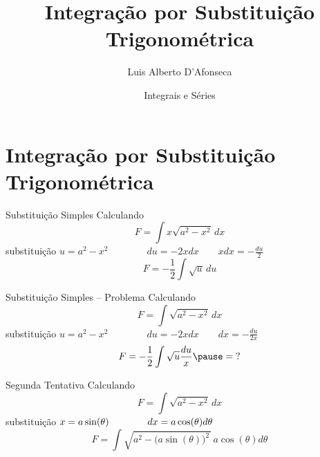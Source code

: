 
\usepackage{apresentacao}
\usepackage{mathconfig}
\usepackage{tabto}
\usepackage{ulem}

\setlength{\parskip}{0.5\baselineskip}

\makeatletter
\graphicspath  {{./figs/}}
\makeatother

\setcounter{exemplo}{0}

\title {Integração por Substituição Trigonométrica}
\author{\large Luis Alberto D'Afonseca}
\date  {Integrais e Séries}



\begin{frame}
    \titlepage
\end{frame}

\section{Integração por Substituição Trigonométrica}

\begin{frame}{Substituição Simples}
  Calculando
  \[
    F = \int x \sqrt{a^2-x^2}\,dx
  \]
  \pause
  substituição
  \(
    u = a^2-x^2
    \qquad\qquad
    du = -2xdx
    \qquad
    xdx = -\frac{du}{2}
  \)
  \pause
  \[
    F = -\frac{1}{2}\int \sqrt{u}\,du
  \]
\end{frame}

\begin{frame}{Substituição Simples -- Problema}
  Calculando
  \[
    F = \int \sqrt{a^2-x^2}\,dx
  \]
  \pause
  substituição
  \(
    u = a^2-x^2
    \qquad\qquad
    du = -2xdx
    \qquad
    dx = -\frac{du}{2x}
  \)
  \pause
  \[
    F
    = -\frac{1}{2}\int \sqrt{u} \frac{du}{x}
    \pause
    =\; ? \vphantom{\int}
  \]
\end{frame}

\begin{frame}{Segunda Tentativa}
  Calculando
  \[
    F = \int \sqrt{a^2-x^2}\,dx
  \]
  \pause
  substituição
  \(
    x = a\sin(\theta)
    \qquad\qquad
    dx = a\cos(\theta)d\theta
    \vphantom{\frac{du}{2}}
  \)
  \pause
  \[
    F = \int \sqrt{a^2 - \big(a\sin(\theta)\big)^2\,} \,a\cos(\theta)d\theta
  \]
\end{frame}

